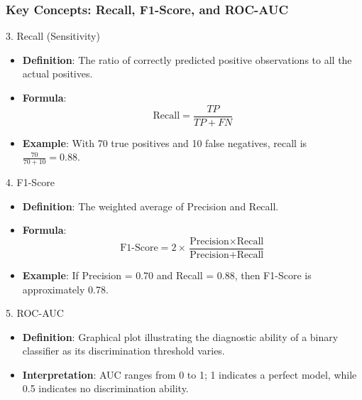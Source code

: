 \documentclass[aspectratio=169]{beamer}
\begin{document}
\begin{frame}[fragile]
    \frametitle{Key Concepts: Recall, F1-Score, and ROC-AUC}
    \begin{block}{3. Recall (Sensitivity)}
        \begin{itemize}
            \item \textbf{Definition}: The ratio of correctly predicted positive observations to all the actual positives.
            \item \textbf{Formula}:
            \begin{equation}
                \text{Recall} = \frac{TP}{TP + FN}
            \end{equation}
            \item \textbf{Example}: With 70 true positives and 10 false negatives, recall is \( \frac{70}{70 + 10} = 0.88 \).
        \end{itemize}
    \end{block}

    \begin{block}{4. F1-Score}
        \begin{itemize}
            \item \textbf{Definition}: The weighted average of Precision and Recall.
            \item \textbf{Formula}:
            \begin{equation}
                \text{F1-Score} = 2 \times \frac{\text{Precision} \times \text{Recall}}{\text{Precision} + \text{Recall}}
            \end{equation}
            \item \textbf{Example}: If Precision = 0.70 and Recall = 0.88, then F1-Score is approximately 0.78.
        \end{itemize}
    \end{block}

    \begin{block}{5. ROC-AUC}
        \begin{itemize}
            \item \textbf{Definition}: Graphical plot illustrating the diagnostic ability of a binary classifier as its discrimination threshold varies.
            \item \textbf{Interpretation}: AUC ranges from 0 to 1; 1 indicates a perfect model, while 0.5 indicates no discrimination ability.
        \end{itemize}
    \end{block}
\end{frame}
\end{document}
